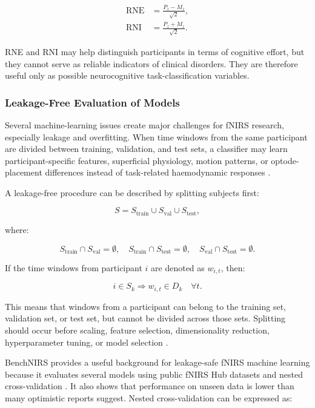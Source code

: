 \begin{align}
\mathrm{RNE} &= \frac{P_z-M_z}{\sqrt{2}},\\
\mathrm{RNI} &= \frac{P_z+M_z}{\sqrt{2}}.
\end{align}

RNE and RNI may help distinguish participants in terms of cognitive effort, but they cannot serve as
reliable indicators of clinical disorders. They are therefore useful only as possible neurocognitive
task-classification variables.

\subsubsection{Leakage-Free Evaluation of Models}

Several machine-learning issues create major challenges for fNIRS research, especially leakage and
overfitting. When time windows from the same participant are divided between training, validation,
and test sets, a classifier may learn participant-specific features, superficial physiology, motion
patterns, or optode-placement differences instead of task-related haemodynamic responses
\cite{Benerradi2023,Brookshire2024}.

A leakage-free procedure can be described by splitting subjects first:

\begin{equation}
S=S_{\text{train}}\cup S_{\text{val}}\cup S_{\text{test}},
\end{equation}

where:

\begin{equation}
S_{\text{train}}\cap S_{\text{val}}=\emptyset,\quad
S_{\text{train}}\cap S_{\text{test}}=\emptyset,\quad
S_{\text{val}}\cap S_{\text{test}}=\emptyset.
\end{equation}

If the time windows from participant \(i\) are denoted as \(w_{i,t}\), then:

\begin{equation}
i\in S_k \Rightarrow w_{i,t}\in D_k
\quad \forall t.
\end{equation}

This means that windows from a participant can belong to the training set, validation set, or test
set, but cannot be divided across those sets. Splitting should occur before scaling, feature
selection, dimensionality reduction, hyperparameter tuning, or model selection \cite{Benerradi2023}.

BenchNIRS provides a useful background for leakage-safe fNIRS machine learning because it evaluates
several models using public fNIRS Hub datasets and nested cross-validation \cite{Benerradi2023}. It
also shows that performance on unseen data is lower than many optimistic reports suggest. Nested
cross-validation can be expressed as:

